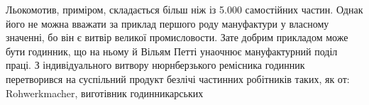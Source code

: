 Льокомотив, приміром, складається більш ніж із \num{5.000} самостійних частин. Однак
його не можна вважати за приклад першого роду мануфактури у власному значенні,
бо він є витвір великої промисловости. Зате добрим прикладом може бути годинник,
що на ньому й Вільям Петті унаочнює мануфактурний поділ праці. З індивідуального
витвору нюрнберзького ремісника годинник перетворився на суспільний продукт
безлічі частинних робітників
таких, як от: Rohwerkmacher, виготівник годинникарських
\parbreak{}  %
